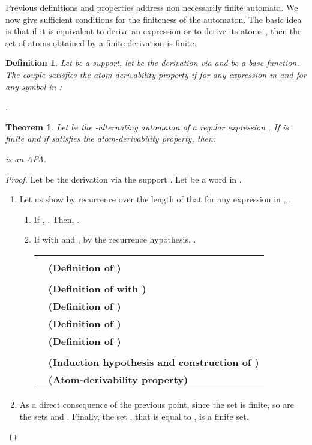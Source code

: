 \documentclass{article}
\newtheorem{definition}{Definition}
\newtheorem{theorem}{Theorem}
\begin{document}
  Previous definitions and properties address non necessarily finite automata. We now give sufficient conditions for the finiteness of the automaton.
The basic idea is that if it is equivalent to derive an expression  or to derive its atoms , then the set of atoms obtained by a finite derivation is finite. 
  
  \begin{definition}
    Let  be a support, let  be the derivation \emph{via}  and  be a base function. The couple  satisfies the \emph{atom-derivability property} if for any expression  in  and for any symbol  in :
    
    \centerline{
      .
    }
  \end{definition}
  
   
  \begin{theorem}\label{thm afa}
    Let  be the -alternating automaton of a regular expression . If  is finite and if  satisfies the atom-derivability property, then:
    
    \centerline{
       is an AFA.
    }
  \end{theorem}
  \begin{proof}
    Let  be the derivation via the support . Let  be a word in .
    
    \begin{enumerate}
    
    \item  Let us show by recurrence over the length of  that for any expression  in , .
  
  \begin{enumerate}
        
      \item If , . Then,  .
      
      \item If  with  and , by the recurrence hypothesis, .
      
      
         \begin{tabular}{l@{\ }l}
          & \\
          &  \hfill\textbf{(Definition of )}\\
          &  \\ & \hfill\textbf{(Definition of  with )}\\
          &  \hfill\textbf{(Definition of )}\\
          &  \hfill\textbf{(Definition of )}\\
&  \hfill\textbf{(Definition of )}\\
          & \\ &  \hfill\textbf{(Induction hypothesis and construction of )}\\
          &  \hfill\textbf{(Atom-derivability property)}\\
         \end{tabular}
         
        
    \end{enumerate}
    \item As a direct consequence of the previous point, since the set  is finite, so are the sets  and  . Finally, the set , that is equal to , is a finite set.
    \end{enumerate}
\end{proof}
  
\end{document}
